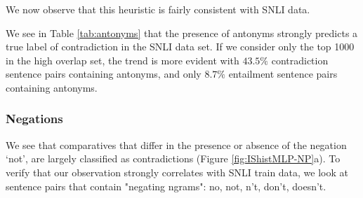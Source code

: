 \documentclass[10pt,letterpaper]{article}
\begin{document}
We now observe that this heuristic is fairly consistent with SNLI data. 
\begin{table}[htb]
 \caption{ Antonym word pair in the SNLI data set}
  \label{tab:antonyms}
\end{table}

We see in Table \ref{tab:antonyms} that the presence of antonyms strongly predicts a true label of contradiction in the SNLI data set. If we consider only the top 1000 in the high overlap set, the trend is more evident with $43.5 \%$ contradiction sentence pairs containing antonyms, and only $8.7 \%$ entailment sentence pairs containing antonyms. 


\subsubsection{Negations}

We see that comparatives that differ in the presence  or absence of the negation `not', are largely classified as contradictions (Figure \ref{fig:IShistMLP-NP}a). To verify that our observation strongly correlates with SNLI train data, we look at sentence pairs that contain "negating ngrams": no, not, n't, don't, doesn't.
\begin{table}[htb]
 \caption{Overall Data Negation statistics}
  \label{tab:negation}
\end{table}
\end{document}
